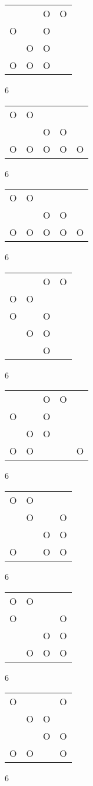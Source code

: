 \begin{tabular}{|m{0.2cm}m{0.2cm}m{0.2cm}m{0.2cm}|}\hline
 & &O&O\\
O& &O& \\
 &O&O& \\
O&O&O& \\
\hline\end{tabular}6
\begin{tabular}{|m{0.2cm}m{0.2cm}m{0.2cm}m{0.2cm}m{0.2cm}|}\hline
O&O& & & \\
 & &O&O& \\
O&O&O&O&O\\
\hline\end{tabular}6
\begin{tabular}{|m{0.2cm}m{0.2cm}m{0.2cm}m{0.2cm}m{0.2cm}|}\hline
O&O& & & \\
 & &O&O& \\
O&O&O&O&O\\
\hline\end{tabular}6
\begin{tabular}{|m{0.2cm}m{0.2cm}m{0.2cm}m{0.2cm}|}\hline
 & &O&O\\
O&O& & \\
O& &O& \\
 &O&O& \\
 & &O& \\
\hline\end{tabular}6
\begin{tabular}{|m{0.2cm}m{0.2cm}m{0.2cm}m{0.2cm}m{0.2cm}|}\hline
 & &O&O& \\
O& &O& & \\
 &O&O& & \\
O&O& & &O\\
\hline\end{tabular}6
\begin{tabular}{|m{0.2cm}m{0.2cm}m{0.2cm}m{0.2cm}|}\hline
O&O& & \\
 &O& &O\\
 & &O&O\\
O& &O&O\\
\hline\end{tabular}6
\begin{tabular}{|m{0.2cm}m{0.2cm}m{0.2cm}m{0.2cm}|}\hline
O&O& & \\
O& & &O\\
 & &O&O\\
 &O&O&O\\
\hline\end{tabular}6
\begin{tabular}{|m{0.2cm}m{0.2cm}m{0.2cm}m{0.2cm}|}\hline
O& & &O\\
 &O&O& \\
 & &O&O\\
O&O& &O\\
\hline\end{tabular}6
